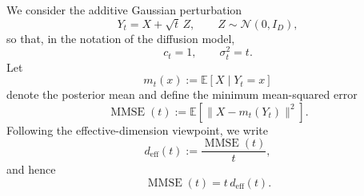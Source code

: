 \documentclass{article}
\theoremstyle{plain}
\theoremstyle{definition}
\theoremstyle{remark}
\begin{document}
We consider the additive Gaussian perturbation
\begin{equation}
    Y_t = X + \sqrt{t}\,Z,
    \qquad
    Z \sim \mathcal{N}(0,I_D),
\end{equation}
so that, in the notation of the diffusion model,
\begin{equation}
    c_t = 1,
    \qquad
    \sigma_t^2=t.
\end{equation}
Let
\begin{equation}
    m_t(x) := \mathbb{E}[X \mid Y_t=x]
\end{equation}
denote the posterior mean and define the minimum mean-squared error
\begin{equation}
    \operatorname{MMSE}(t)
    :=
    \mathbb{E}\left[\|X-m_t(Y_t)\|^2\right].
\end{equation}
Following the effective-dimension viewpoint, we write
\begin{equation}
    d_{\mathrm{eff}}(t)
    :=
    \frac{\operatorname{MMSE}(t)}{t},
\end{equation}
and hence
\begin{equation}
    \operatorname{MMSE}(t)
    =
    t\,d_{\mathrm{eff}}(t).
    \label{eq:mmse-deff}
\end{equation}
\end{document}
